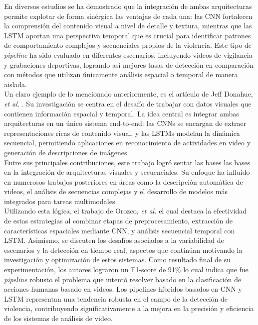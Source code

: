 En diversos estudios se ha demostrado que la integración 
de ambas arquitecturas permite explotar de forma sinérgica 
las ventajas de cada una\cite{mohammadi2022cnn}: las CNN fortalecen la comprensión 
del contenido visual a nivel de detalle y textura, mientras 
que las LSTM aportan una perspectiva temporal que es crucial 
para identificar patrones de comportamiento complejos y 
secuenciales propios de la violencia. Este tipo de 
\textit{pipeline} ha sido evaluado en diferentes escenarios, 
incluyendo videos de vigilancia y grabaciones deportivas, 
logrando así mejores tasas de detección en comparación con 
métodos que utilizan únicamente análisis espacial o temporal 
de manera aislada.\\

Un claro ejemplo de lo mencionado anteriormente, 
es el artículo de Jeff Donahue, \textit{et al.}
\cite{Donahue2016}. Su investigación se centra en el 
desafío de trabajar con datos visuales que contienen 
información espacial y temporal. La idea central es 
integrar ambas arquitecturas en un único sistema 
end-to-end: las CNNs se encargan de extraer 
representaciones ricas de contenido visual, y las 
LSTMs modelan la dinámica secuencial, permitiendo 
aplicaciones en reconocimiento de actividades en video y 
generación de descripciones de imágenes. \\

Entre sus principales contribuciones, este trabajo 
logró sentar las bases las bases en la integración de 
arquitecturas visuales y secuenciales. Su enfoque ha 
influido en numerosos trabajos posteriores en áreas como 
la descripción automática de videos, el análisis de 
secuencias complejas y el desarrollo de modelos más 
integrados para tareas multimodales.\\

Utilizando esta lógica, el trabajo de Orozco, \textit{et al.}
\cite{Orozco2021} el cual 
destaca la efectividad de estas estrategias al combinar 
etapas de preprocesamiento, extracción de características 
espaciales mediante CNN, y análisis secuencial temporal con 
LSTM. Asimismo, se discuten los desafíos asociados a la 
variabilidad de escenarios y la detección en tiempo real, 
aspectos que continúan motivando la investigación y 
optimización de estos sistemas. Como resultado final de su 
experimentación, los autores lograron un F1-score de 91\% 
lo cual indica que fue \textit{pipeline} robusto el 
problema que intentó resolver basado en la clasificación de 
acciones humanas basado en videos. Los pipelines híbridos 
basados en CNN y LSTM representan una tendencia robusta en 
el campo de la detección de violencia, contribuyendo 
significativamente a la mejora en la precisión y eficiencia 
de los sistemas de análisis de video.\\

